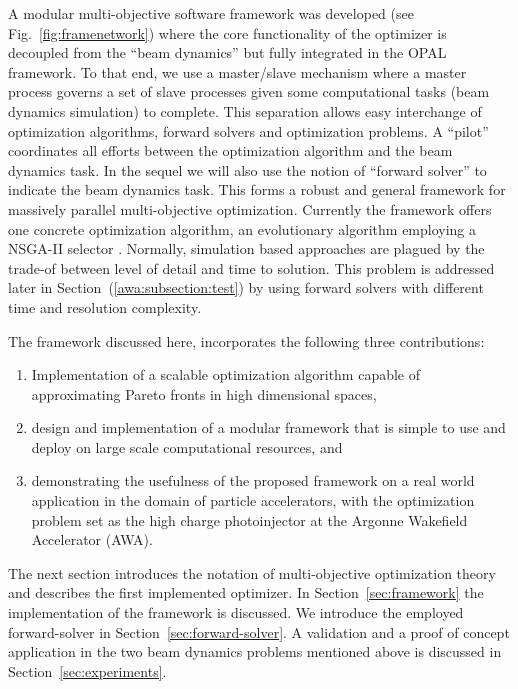 \documentclass[%
preprint,
preprint,
linenumbers,
amsmath,amssymb,
aps,
prstab,
]{revtex4-1}
\begin{document}
A modular multi-objective software framework was developed (see
 Fig.~\ref{fig:framenetwork}) where the core functionality of the optimizer is decoupled from
 the ``beam dynamics'' but fully integrated in the OPAL \cite{opal} framework. 
To that end, we use a master/slave mechanism where a master process governs a
 set of slave processes given some computational tasks (beam dynamics simulation) to complete.
This separation allows easy interchange of optimization algorithms, forward
  solvers and optimization problems.
A ``pilot'' coordinates all efforts between the optimization algorithm and the
  beam dynamics task. In the sequel we will also use the notion of ``forward solver'' to indicate the beam dynamics task.
This forms a robust and general framework for massively parallel
  multi-objective optimization.
Currently the framework offers one concrete optimization algorithm, an
  evolutionary algorithm employing a \textsc{NSGA-II} selector \cite{pisa}.
Normally, simulation based approaches are plagued by the trade-of between
  level of detail and time to solution.
This problem is addressed later in Section~(\ref{awa:subsection:test}) by using forward solvers with different time and
  resolution complexity.

The framework discussed here, incorporates the following three contributions:
%
\begin{enumerate}
  \item Implementation of a scalable optimization algorithm capable of
        approximating Pareto fronts in high dimensional spaces,
  \item design and implementation of a modular framework that is simple to use
        and deploy on large scale computational resources, and
  \item demonstrating the usefulness of the proposed framework on a real world
        application in the domain of particle accelerators,
        with the optimization problem set as 
        the high charge photoinjector at the Argonne Wakefield Accelerator (AWA). 
\end{enumerate}

The next section introduces the notation of multi-objective optimization
theory and describes the first implemented optimizer.
In Section~\ref{sec:framework} the implementation of the framework is discussed.
We introduce the employed forward-solver in Section~\ref{sec:forward-solver}.
A validation and a proof of concept application in the two beam dynamics problems 
mentioned above is discussed in Section~\ref{sec:experiments}.
\end{document}
